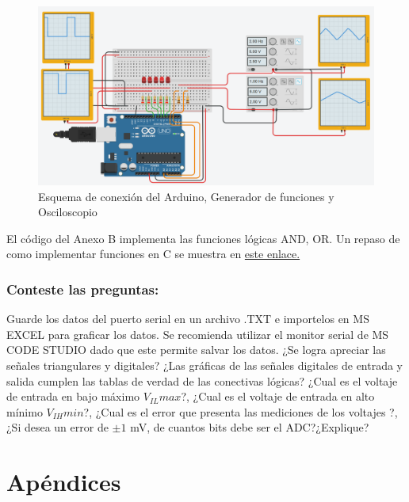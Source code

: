 \begin{figure}[H]
	\centering
	\includegraphics[width=0.8\linewidth]{Imagenes/Fig2}
	\caption{Esquema de conexión del Arduino, Generador de funciones y Osciloscopio}
	\label{fig:fig2}
\end{figure}


El código del Anexo B implementa las funciones lógicas AND, OR. Un repaso de como implementar funciones en C se muestra en \href{https://aprendiendoarduino.wordpress.com/2016/11/16/funciones-definidas-por-usuario-2/}{este enlace.} 

\subsubsection{Conteste las preguntas:}

Guarde los datos del puerto serial en un archivo .TXT e importelos en MS EXCEL para graficar los datos.
Se recomienda utilizar el monitor serial de MS CODE STUDIO dado que este permite salvar los datos.
¿Se logra apreciar las señales triangulares y digitales?
¿Las gráficas de las señales digitales de entrada y salida cumplen las tablas de verdad de las conectivas lógicas?
¿Cual es el voltaje de entrada en bajo máximo $V_{IL} max$?,
¿Cual es el voltaje de entrada en alto mínimo $V_{IH} min$?,
¿Cual es el error que presenta las mediciones de los voltajes ?,
¿Si desea un error de $\pm1$ mV, de cuantos bits debe ser el ADC?¿Explique?

\section*{Apéndices}
\setcounter{chapter}{1}
\setcounter{section}{5}
